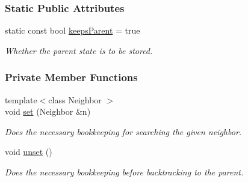 \subsubsection*{Static Public Attributes}
\begin{DoxyCompactItemize}
\item 
static const bool \hyperlink{structslb_1_1ext_1_1policy_1_1backtrackLock_1_1Inplace_3_01MyAlgorithm_00_01true_01_4_a5f637322f0bd991877c9bfb9e48bccb4}{keeps\+Parent} = true\hypertarget{structslb_1_1ext_1_1policy_1_1backtrackLock_1_1Inplace_3_01MyAlgorithm_00_01true_01_4_a5f637322f0bd991877c9bfb9e48bccb4}{}\label{structslb_1_1ext_1_1policy_1_1backtrackLock_1_1Inplace_3_01MyAlgorithm_00_01true_01_4_a5f637322f0bd991877c9bfb9e48bccb4}

\begin{DoxyCompactList}\small\item\em Whether the parent state is to be stored. \end{DoxyCompactList}\end{DoxyCompactItemize}
\subsubsection*{Private Member Functions}
\begin{DoxyCompactItemize}
\item 
{\footnotesize template$<$class Neighbor $>$ }\\void \hyperlink{structslb_1_1ext_1_1policy_1_1backtrackLock_1_1Inplace_3_01MyAlgorithm_00_01true_01_4_aa9a86059dcafdec3f8498eb12a06153f}{set} (Neighbor \&n)
\begin{DoxyCompactList}\small\item\em Does the necessary bookkeeping for searching the given neighbor. \end{DoxyCompactList}\item 
void \hyperlink{structslb_1_1ext_1_1policy_1_1backtrackLock_1_1Inplace_3_01MyAlgorithm_00_01true_01_4_a20c434c629d4e15d7688493da6bb79ef}{unset} ()\hypertarget{structslb_1_1ext_1_1policy_1_1backtrackLock_1_1Inplace_3_01MyAlgorithm_00_01true_01_4_a20c434c629d4e15d7688493da6bb79ef}{}\label{structslb_1_1ext_1_1policy_1_1backtrackLock_1_1Inplace_3_01MyAlgorithm_00_01true_01_4_a20c434c629d4e15d7688493da6bb79ef}

\begin{DoxyCompactList}\small\item\em Does the necessary bookkeeping before backtracking to the parent. \end{DoxyCompactList}\end{DoxyCompactItemize}
